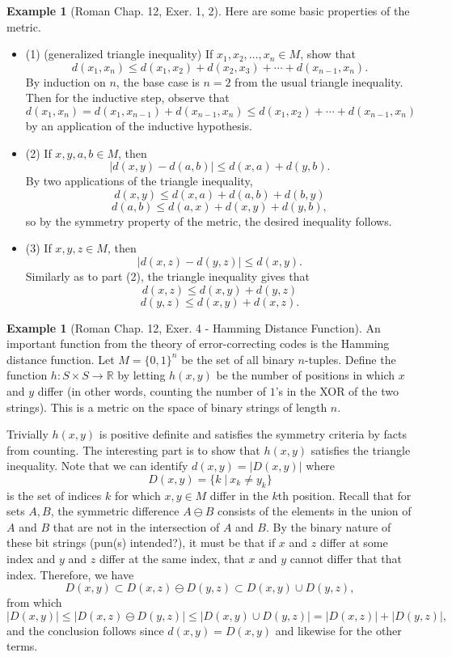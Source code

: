 \documentclass{article}
\theoremstyle{definition}
\newtheorem{exmp}[thm]{Example}
\theoremstyle{remark}
\numberwithin{equation}{section}
\begin{document}
\begin{exmp}[Roman Chap. 12, Exer. 1, 2]
Here are some basic properties of the metric.
\begin{itemize}
    \item (1) (generalized triangle inequality) If $x_1, x_2, \dots , x_n \in M$, show that 
    $$d(x_1, x_n) \leq d(x_1, x_2) + d(x_2, x_3) + \cdots + d(x_{n-1}, x_n ).$$
    By induction on $n$, the base case is $n = 2$ from the usual triangle inequality. Then for the inductive step, observe that 
    $$d(x_1, x_n) = d(x_1, x_{n-1}) + d(x_{n-1}, x_n) \leq d(x_1, x_2) + \cdots + d(x_{n-1}, x_n) $$
    by an application of the inductive hypothesis. 
    \item (2) If $x,y,a,b \in M$, then 
    $$|d(x,y) - d(a,b)| \leq d(x,a) + d(y,b). $$
    By two applications of the triangle inequality, 
    $$d(x,y) \leq d(x,a) + d(a, b) + d(b, y) $$
    $$d(a,b) \leq d(a, x) + d(x,y) + d(y,b), $$
    so by the symmetry property of the metric, the desired inequality follows. 
    \item (3) If $x,y,z \in M$, then 
    $$|d(x,z) - d(y,z)| \leq d(x,y).$$
    Similarly as to part (2), the triangle inequality gives that 
    $$d(x,z) \leq d(x,y) + d(y,z) $$
    $$d(y,z) \leq d(x,y) + d(x,z). $$
\end{itemize}
\end{exmp}

\begin{exmp}[Roman Chap. 12, Exer. 4 - Hamming Distance Function]
An important function from the theory of error-correcting codes is the Hamming distance function. Let $M = \{ 0, 1 \} ^n$ be the set of all binary $n$-tuples. Define the function $h: S \times S \rightarrow \mathbb{R}$ by letting $h(x,y)$ be the number of positions in which $x$ and $y$ differ (in other words, counting the number of $1$'s in the XOR of the two strings). This is a metric on the space of binary strings of length $n$. 

Trivially $h(x,y)$ is positive definite and satisfies the symmetry criteria by facts from counting. The interesting part is to show that $h(x,y)$ satisfies the triangle inequality. Note that we can identify $d(x,y) = |D(x,y) |$ where
$$D(x,y) = \{ k \; | \: x_k \neq y_k \} $$
is the set of indices $k$ for which $x,y \in M$ differ in the $k$th position. Recall that for sets $A, B$, the symmetric difference $A\ominus B$ consists of the elements in the union of $A$ and $B$ that are not in the intersection of $A$ and $B$. By the binary nature of these bit strings (pun(s) intended?), it must be that if $x$ and $z$ differ at some index and $y$ and $z$ differ at the same index, that $x$ and $y$ cannot differ that that index. Therefore, we have
$$D(x,y) \subset D(x,z) \ominus D(y,z) \subset D(x,y) \cup D(y,z), $$
from which 
$$|D(x,y)| \leq |D(x,z) \ominus D(y,z) | \leq |D(x,y) \cup D(y,z) | = |D(x,z)| + |D(y,z)|,$$
and the conclusion follows since $d(x,y) = D(x,y)$ and likewise for the other terms.
\end{exmp}
\end{document}
